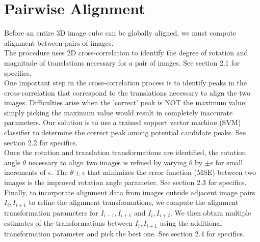 \documentclass{article}
\begin{document}
\section{Pairwise Alignment}
Before an entire 3D image cube can be globally aligned, we must compute alignment between pairs of images.
\\
The procedure uses 2D cross-correlation to identify the degree of rotation and magnitude of translations necessary for a pair of images. See section 2.1 for specifics. 
\\
One important step in the cross-correlation process is to identify peaks in the cross-correlation that correspond to the translations necessary to align the two images. Difficulties arise when the 'correct' peak is NOT the maximum value; simply picking the maximum value would result in completely inaccurate parameters. Our solution is to use a trained support vector machine (SVM) classifier to determine the correct peak among potential candidate peaks. See section 2.2 for specifics. 
\\
Once the rotation and translation transformations are identified, the rotation angle $\theta$ necessary to align two images is refined by varying $\theta$ by $\pm \epsilon$ for small increments of $\epsilon$. The $\theta \pm \epsilon$ that minimizes the error function (MSE) between two images is the improved rotation angle parameter. See section 2.3 for specifics.
\\
Finally, to incorporate alignment data from images outside adjacent image pairs $I_i, I_{i+1}$ to refine the alignment transformations, we compute the alignment transformation parameters for $I_{i-1}, I_{i+1}$ and $I_i, I_{i+2}$. We then obtain multiple estimates of the transformations between $I_i, I_{i+1}$ using the additional transformation parameter and pick the best one. See section 2.4 for specifics.
\end{document}
